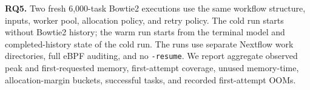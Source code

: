 \noindent\textbf{RQ5.} Two fresh 6,000-task Bowtie2 executions use the same
workflow structure, inputs, worker pool, \toolname{} allocation policy, and
retry policy. The cold run starts without Bowtie2 history; the warm run starts
from the terminal model and completed-history state of the cold run. The runs
use separate Nextflow work directories, full eBPF auditing, and no
\texttt{-resume}. We report aggregate observed peak and first-requested memory,
first-attempt coverage, unused memory-time, allocation-margin buckets,
successful tasks, and recorded first-attempt OOMs.
